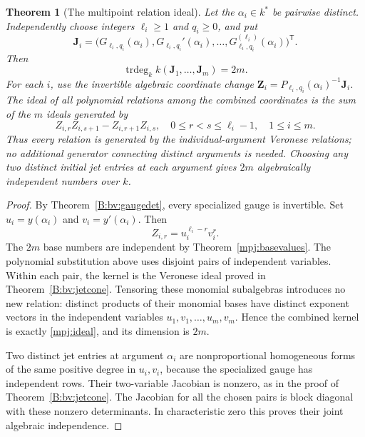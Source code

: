 \documentclass[11pt,a4paper]{article}
\newtheorem{theorem}{Theorem}[section]
\theoremstyle{definition}
\theoremstyle{remark}
\numberwithin{equation}{section}
\begin{document}
\begin{theorem}[The multipoint relation ideal]
\label{mpj:alljets}
Let the $\alpha_i\in k^*$ be pairwise distinct. Independently
choose integers $\ell_i\ge1$ and $q_i\ge0$, and put
\[
 \mathbf J_i=
 \bigl(G_{\ell_i,q_i}(\alpha_i),G_{\ell_i,q_i}'(\alpha_i),
                 \ldots,G_{\ell_i,q_i}^{(\ell_i)}(\alpha_i)\bigr)^{\mathsf T}.
\]
Then
\[
 \operatorname{trdeg}_k k(\mathbf J_1,\ldots,\mathbf J_m)=2m.
\]
For each $i$, use the invertible algebraic coordinate change
$\mathbf Z_i=P_{\ell_i,q_i}(\alpha_i)^{-1}\mathbf J_i$.
The ideal of all polynomial relations among the combined
coordinates is the sum of the $m$ ideals generated by
\begin{equation}\label{mpj:ideal}
 Z_{i,r}Z_{i,s+1}-Z_{i,r+1}Z_{i,s},
 \quad 0\le r<s\le\ell_i-1,\quad 1\le i\le m.
\end{equation}
Thus every relation is generated by the individual-argument
Veronese relations; no additional generator connecting distinct
arguments is needed. Choosing any two distinct initial jet
entries at each argument gives $2m$ algebraically independent
numbers over $k$.
\end{theorem}
\begin{proof}
By Theorem~\ref{B:bv:gaugedet}, every specialized gauge is
invertible. Set $u_i=y(\alpha_i)$ and $v_i=y'(\alpha_i)$.
Then
\[
                  Z_{i,r}=u_i^{\ell_i-r}v_i^r.
\]
The $2m$ base numbers are independent by
Theorem~\ref{mpj:basevalues}. The polynomial substitution above
uses disjoint pairs of independent variables. Within each pair,
the kernel is the Veronese ideal proved in
Theorem~\ref{B:bv:jetcone}. Tensoring these monomial subalgebras
introduces no new relation: distinct products of their monomial
bases have distinct exponent vectors in the independent variables
$u_1,v_1,\ldots,u_m,v_m$. Hence the combined kernel is exactly
\eqref{mpj:ideal}, and its dimension is $2m$.

Two distinct jet entries at argument $\alpha_i$ are
nonproportional homogeneous forms of the same positive degree
in $u_i,v_i$, because the specialized gauge has independent rows.
Their two-variable Jacobian is nonzero, as in the proof of
Theorem~\ref{B:bv:jetcone}. The Jacobian for all the chosen pairs
is block diagonal with these nonzero determinants. In
characteristic zero this proves their joint algebraic independence.
\end{proof}
\end{document}
